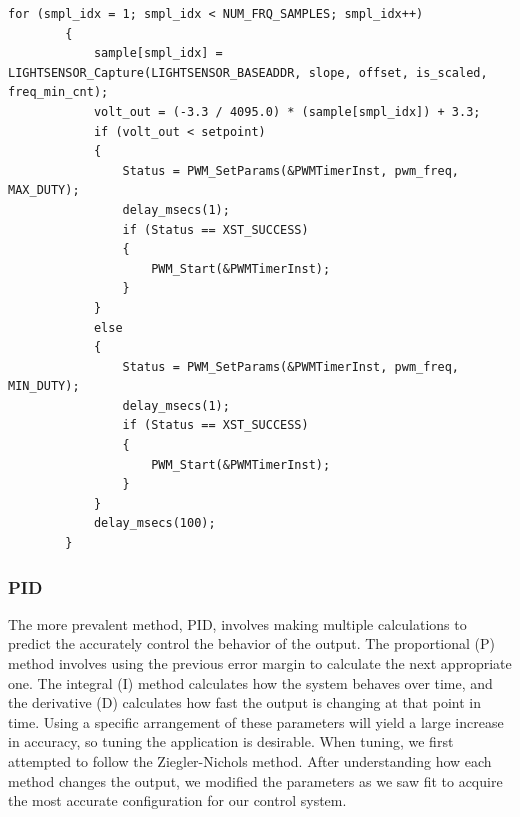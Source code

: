 \documentclass[11pt]{article}
\begin{document}
 \begin{lstlisting}[caption=Bang Bang Algorithm, label=bang]		
 	 for (smpl_idx = 1; smpl_idx < NUM_FRQ_SAMPLES; smpl_idx++)
 	    {
 	        sample[smpl_idx] = LIGHTSENSOR_Capture(LIGHTSENSOR_BASEADDR, slope, offset, is_scaled, freq_min_cnt);
 	        volt_out = (-3.3 / 4095.0) * (sample[smpl_idx]) + 3.3; 
 	        if (volt_out < setpoint)
 	        {
 	            Status = PWM_SetParams(&PWMTimerInst, pwm_freq, MAX_DUTY);
 	            delay_msecs(1);
 	            if (Status == XST_SUCCESS)
 	            {
 	                PWM_Start(&PWMTimerInst);
 	            }
 	        }
 	        else
 	        {
 	            Status = PWM_SetParams(&PWMTimerInst, pwm_freq, MIN_DUTY);
 	            delay_msecs(1);
 	            if (Status == XST_SUCCESS)
 	            {
 	                PWM_Start(&PWMTimerInst);
 	            }
 	        }
 	        delay_msecs(100);
 	    }
  \end{lstlisting}

\subsubsection{PID}
The more prevalent method, PID, involves making multiple calculations to predict the accurately control the behavior of the output.  The proportional (P) method involves using the previous error margin to calculate the next appropriate one.  The integral (I) method calculates how the system behaves over time, and the derivative (D) calculates how fast the output is changing at that point in time.
Using a specific arrangement of these parameters will yield a large increase in accuracy, so tuning the application is desirable.  When tuning, we first attempted to follow the Ziegler-Nichols method.  After understanding how each method changes the output, we modified the parameters as we saw fit to acquire the most accurate configuration for our control system.

\vspace{12pt}
\end{document}
